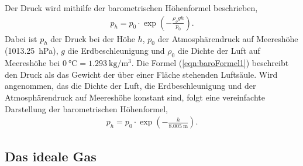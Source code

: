 Der Druck wird mithilfe der barometrischen Höhenformel beschrieben,
\begin{align}
    \label{eqn:baroFormel1}
    p_h = p_0\cdot \exp\left({-\frac{\rho_o gh}{p_0}}\right).
\end{align}
Dabei ist $p_h$ der Druck bei der Höhe $h$, $p_0$ der Atmosphärendruck auf Meereshöhe (\SI{1013,25}{\hecto\pascal}), $g$ die Erdbeschleunigung und $\rho_0$ die Dichte der Luft
auf Meereshöhe bei $\SI{0}{\celsius} = \SI{1,293}{\kilo\gram\per\meter\cubed}$. Die Formel (\ref{eqn:baroFormel1}) beschreibt den Druck als das Gewicht der über einer Fläche
stehenden Luftsäule. 
Wird angenommen, das die Dichte der Luft, die Erdbeschleunigung und der Atmosphärendruck auf Meereshöhe konstant sind, folgt eine vereinfachte Darstellung der barometrischen
Höhenformel,
\begin{align}
    \label{eqn:baroFormel2}
    p_h = p_0\cdot\exp\left(-\frac{h}{\SI{8,005}{\meter}}\right).
\end{align}

\subsection{Das ideale Gas}
\label{subsec:idGas}

